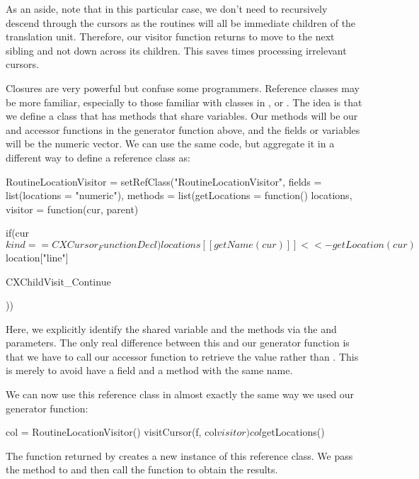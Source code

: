 As an aside, note that in this particular case, we don't need to
recursively descend through the cursors as the routines will all be
immediate children of the translation unit.  Therefore, our visitor
function returns  to move to the next
sibling and not down across its children.  This saves times processing
irrelevant cursors.

Closures are very powerful but confuse some \R{} programmers.
Reference classes may be more familiar, especially to those familiar
with classes in \Cpp, \Java{} or \Python.  The idea is that we define
a class that has methods that share variables.  Our methods will be
our  and  accessor functions in the generator
function above, and the fields or variables will be the
 numeric vector.  We can use the same code, but
aggregate it in a different way to define a reference class as:
\begin{RCode}
RoutineLocationVisitor =
setRefClass("RoutineLocationVisitor",
    fields = list(locations = "numeric"),
    methods = list(getLocations = function() 
                                     locations,
                   visitor = 
                       function(cur, parent) {
                         if(cur$kind == CXCursor_FunctionDecl) 
                            locations[[ getName(cur) ]] <<- 
                                   getLocation(cur)$location["line"]
                               
                         CXChildVisit_Continue
                       }))
\end{RCode}
Here, we explicitly identify the shared variable and the methods via
the  and  parameters.  The only real
difference between this and our generator function is that we have
to call our accessor function to retrieve the  value
 rather than .  This is merely to
avoid have a field and a method with the same name.

We can now use this reference class in almost exactly the same way we
used our  generator function:
\begin{RCode}
col = RoutineLocationVisitor()
visitCursor(f, col$visitor)
col$getLocations()
\end{RCode}
The  function returned by
 creates a new instance of this reference class.
We pass the  method to  and then
call the function  to obtain the results.



